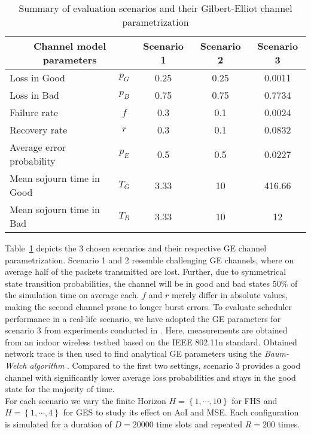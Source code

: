 \begin{table}[htb]
  \begin{center}
  \begin{tabular}{|lc|c|c|c|} 
  \hline
  \multicolumn{2}{|c|}{\textbf{Channel model parameters}} & \textbf{Scenario 1} & \textbf{Scenario 2} & \textbf{Scenario 3} \\
  \hline \hline
  Loss in Good & $p_G$ & 0.25 & 0.25 & 0.0011 \\ 
  Loss in Bad & $p_B$ & 0.75 & 0.75 &  0.7734 \\ 
  Failure rate & $f$ & 0.3 & 0.1 & 0.0024 \\ 
  Recovery rate & $r$ & 0.3 & 0.1 & 0.0832 \\
  \hline
  Average error probability & $p_E$ & 0.5 & 0.5 & 0.0227 \\
  Mean sojourn time in Good & $T_G$ & 3.33 & 10 & 416.66 \\
  Mean sojourn time in Bad & $T_B$ & 3.33 & 10 & 12 \\
  \hline
  \end{tabular}
  \end{center}
  \caption{Summary of evaluation scenarios and their Gilbert-Elliot channel parametrization}
  \label{tab:scenarios}
\end{table}

Table~\ref{tab:scenarios} depicts the 3 chosen scenarios and their respective GE
channel parametrization. Scenario 1 and 2 resemble challenging GE channels,
where on average half of the packets transmitted are lost. Further, due to
symmetrical state transition probabilities, the channel will be in good and bad
states 50\% of the simulation time on average each. $f$ and $r$ merely differ in
absolute values, making the second channel prone to longer burst errors. To
evaluate scheduler performance in a real-life scenario, we have adopted the GE
parameters for scenario 3 from experiments conducted in
\cite{frohn2011analyzing}. Here, measurements are obtained from an indoor
wireless testbed based on the IEEE 802.11n standard. Obtained network trace is
then used to find analytical GE parameters using the \textit{Baum-Welch
algorithm} \cite{baum1970maximization}. Compared to the first two settings,
scenario 3 provides a good channel with significantly lower average loss
probabilities and stays in the good state for the majority of time. \\ 
For each scenario we vary the finite Horizon $H=\left\{ 1, \cdots, 10\right\}$
for FHS and $H=\left\{ 1, \cdots, 4\right\}$ for GES to study its effect on AoI
and MSE. Each configuration is simulated for a duration of $D=20000$ time slots
and repeated $R=200$ times.

